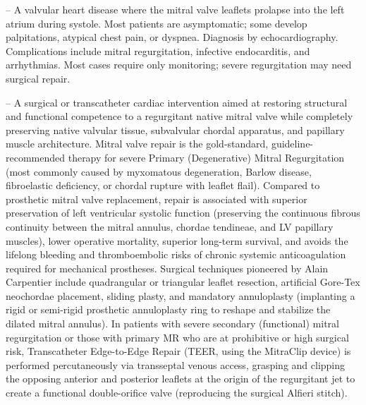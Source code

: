 -- A valvular heart disease where the mitral valve leaflets prolapse into the left atrium during systole. Most patients are asymptomatic; some develop palpitations, atypical chest pain, or dyspnea. Diagnosis by echocardiography. Complications include mitral regurgitation, infective endocarditis, and arrhythmias. Most cases require only monitoring; severe regurgitation may need surgical repair.

-- A surgical or transcatheter cardiac intervention aimed at restoring structural and functional competence to a regurgitant native mitral valve while completely preserving native valvular tissue, subvalvular chordal apparatus, and papillary muscle architecture. Mitral valve repair is the gold-standard, guideline-recommended therapy for severe Primary (Degenerative) Mitral Regurgitation (most commonly caused by myxomatous degeneration, Barlow disease, fibroelastic deficiency, or chordal rupture with leaflet flail). Compared to prosthetic mitral valve replacement, repair is associated with superior preservation of left ventricular systolic function (preserving the continuous fibrous continuity between the mitral annulus, chordae tendineae, and LV papillary muscles), lower operative mortality, superior long-term survival, and avoids the lifelong bleeding and thromboembolic risks of chronic systemic anticoagulation required for mechanical prostheses. Surgical techniques pioneered by Alain Carpentier include quadrangular or triangular leaflet resection, artificial Gore-Tex neochordae placement, sliding plasty, and mandatory annuloplasty (implanting a rigid or semi-rigid prosthetic annuloplasty ring to reshape and stabilize the dilated mitral annulus). In patients with severe secondary (functional) mitral regurgitation or those with primary MR who are at prohibitive or high surgical risk, Transcatheter Edge-to-Edge Repair (TEER, using the MitraClip device) is performed percutaneously via transseptal venous access, grasping and clipping the opposing anterior and posterior leaflets at the origin of the regurgitant jet to create a functional double-orifice valve (reproducing the surgical Alfieri stitch).


